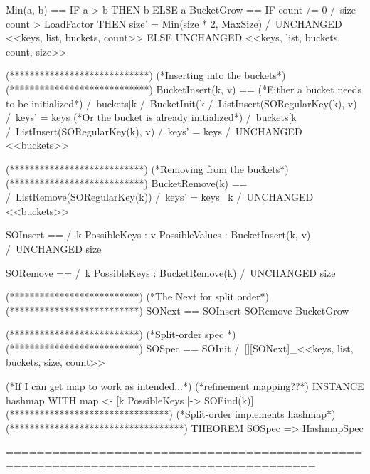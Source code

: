 \documentclass{uit-thesis}
\begin{document}
\begin{tla}
                     Min(a, b) == IF a > b THEN b ELSE a
                     BucketGrow == IF count /= 0 /\ size \div count > LoadFactor
                     THEN size' = Min(size * 2, MaxSize) /\ UNCHANGED <<keys, list, buckets, count>> 
                     ELSE UNCHANGED <<keys, list, buckets, count, size>>
                     
                     (****************************)
                     (*Inserting into the buckets*)
                     (****************************)
                     BucketInsert(k, v) == (*Either a bucket needs to be initialized*)
                     \/  /\ buckets[k %
                     /\ BucketInit(k %
                     /\ ListInsert(SORegularKey(k), v)
                     /\ keys' = keys                       
                     (*Or the bucket is already initialized*)
                     \/  /\ buckets[k %
                     /\ ListInsert(SORegularKey(k), v)
                     /\ keys' = keys 
                     /\ UNCHANGED <<buckets>>
                     
                     (***************************)
                     (*Removing from the buckets*)
                     (***************************)                
                     BucketRemove(k) == /\ ListRemove(SORegularKey(k))
                     /\ keys' = keys \ {k}
                     /\ UNCHANGED <<buckets>>
                     
                     
                     SOInsert == /\  \E k \in PossibleKeys :
                     \E v \in PossibleValues :
                     BucketInsert(k, v)
                     /\ UNCHANGED size
                     
                     SORemove == /\  \E k \in PossibleKeys :
                     BucketRemove(k)
                     /\ UNCHANGED size
                     
                     
                     (**************************)
                     (*The Next for split order*)
                     (**************************)
                     SONext ==   \/ SOInsert
                     \/ SORemove
                     \/ BucketGrow
                     
                     (**************************)
                     (*Split-order spec         *)
                     (**************************)
                     SOSpec == SOInit /\ [][SONext]_<<keys, list, buckets, size, count>>
                     
                     
                     (*If I can get map to work as intended...*)
                     (*refinement mapping??*)
                     INSTANCE  hashmap WITH map <- [k \in PossibleKeys |-> SOFind(k)]
                     (********************************)
                     (*Split-order implements hashmap*)
                     (***********************************)
                     THEOREM SOSpec => HashmapSpec
                     
                     ======================================================================================
    \end{tla}
\end{document}
